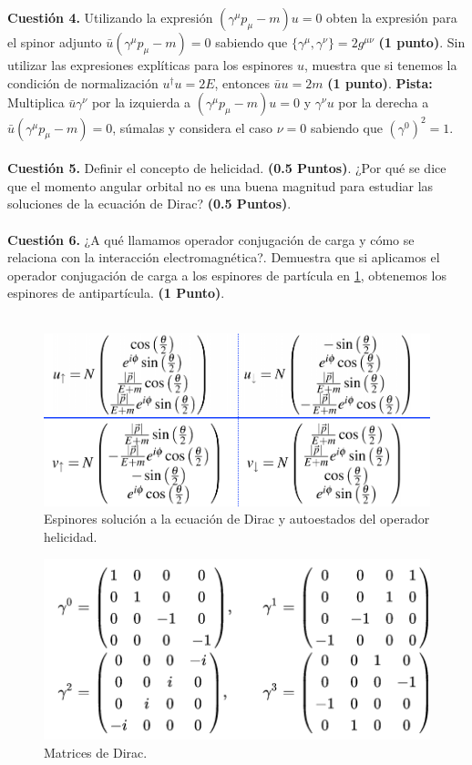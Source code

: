 \documentclass[paper=a4, fontsize=11pt]{scrartcl} %
\numberwithin{equation}{section} %
\numberwithin{figure}{section} %
\numberwithin{table}{section} %
\begin{document}
\textbf{Cuestión 4.} Utilizando la expresión $(\gamma^\mu p_\mu - m)u = 0$ obten la expresión para el spinor adjunto $\bar{u}(\gamma^\mu p_\mu - m) = 0$ sabiendo que $\{\gamma^\mu, \gamma^\nu\}=2g^{\mu\nu}$ \textbf{(1 punto)}. Sin utilizar las expresiones explíticas para los espinores $u$, muestra que si tenemos la condición de normalización $u^\dag u=2E$, entonces $\bar{u}u = 2m$ \textbf{(1 punto)}. \textbf{Pista:} Multiplica $\bar{u}\gamma^\nu$ por la izquierda a $(\gamma^\mu p_\mu - m)u = 0$ y $\gamma^\nu u$ por la derecha a $\bar{u}(\gamma^\mu p_\mu - m) = 0$, súmalas y considera el caso $\nu=0$ sabiendo que $(\gamma^0)^2=1$.
\\
\\
\textbf{Cuestión 5.} Definir el concepto de helicidad. \textbf{(0.5 Puntos)}. ¿Por qué se dice que el momento angular orbital no es una buena magnitud para estudiar las soluciones de la ecuación de Dirac? \textbf{(0.5 Puntos)}.
\\
\\
\textbf{Cuestión 6.} ¿A qué llamamos operador conjugación de carga y cómo se relaciona con la interacción electromagnética?. Demuestra que si aplicamos el operador conjugación de carga
a los espinores de partícula en \ref{espinores}, obtenemos los espinores de antipartícula. \textbf{(1 Punto)}.
\\
\\

\begin{figure}[!h]
\begin{center}
\includegraphics[width=0.6\linewidth]{espinores.png}
\end{center}
\caption{Espinores solución a la ecuación de Dirac y autoestados del operador helicidad.}
\label{espinores}
\end{figure}


\begin{figure}[!h]
\begin{center}
\includegraphics[width=0.6\linewidth]{matrices.png}
\end{center}
\caption{Matrices de Dirac.}
\label{matrices}
\end{figure}
\end{document}
